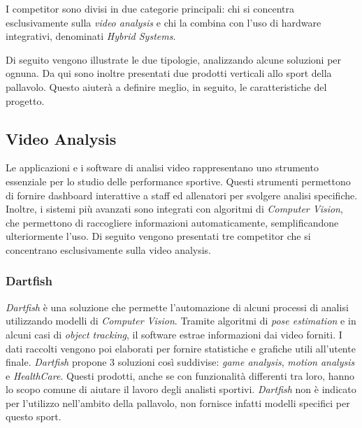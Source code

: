 I competitor sono divisi in due categorie principali: chi si concentra esclusivamente sulla \textit{video analysis} e chi la combina con l'uso di hardware integrativi, denominati \textit{Hybrid Systems}.





\noindent Di seguito vengono illustrate le due tipologie, analizzando alcune soluzioni per ognuna. Da qui sono inoltre presentati due prodotti verticali allo sport della pallavolo. Questo aiuterà a definire meglio, in seguito, le caratteristiche del progetto. 
\pagebreak


\subsection{Video Analysis}
Le applicazioni e i software di analisi video rappresentano uno strumento essenziale per lo studio delle performance sportive. Questi strumenti permettono di fornire dashboard interattive a staff ed allenatori per svolgere analisi specifiche. Inoltre, i sistemi più avanzati sono integrati con algoritmi di \textit{Computer Vision}, che permettono di raccogliere informazioni automaticamente, semplificandone ulteriormente l'uso. 
\noindent Di seguito vengono presentati tre competitor che si concentrano esclusivamente sulla video analysis.


\subsubsection{Dartfish}
\textit{Dartfish} \cite{DartFish} è una soluzione che permette l'automazione di alcuni processi di analisi utilizzando modelli di \textit{Computer Vision}. Tramite algoritmi di \textit{pose estimation} e in alcuni casi di \textit{object tracking}, il software estrae informazioni dai video forniti. I dati raccolti vengono poi elaborati per fornire statistiche e grafiche utili all'utente finale. \textit{Dartfish} propone 3 soluzioni così suddivise: \textit{game analysis}, \textit{motion analysis} e \textit{HealthCare}. Questi prodotti, anche se con funzionalità differenti tra loro, hanno lo scopo comune di aiutare il lavoro degli analisti sportivi. \textit{Dartfish} non è indicato per l'utilizzo nell'ambito della pallavolo, non fornisce infatti modelli specifici per questo sport.

